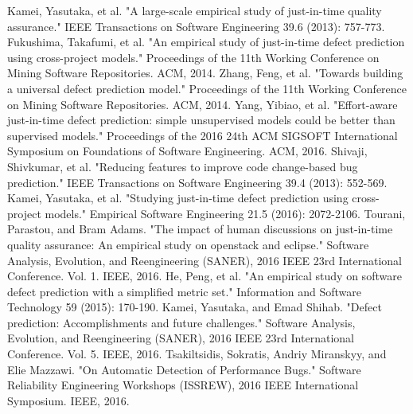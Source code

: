 \documentclass[10pt, conference, compsocconf]{IEEEtran}
\begin{document}
\begin{thebibliography}{1}
Kamei, Yasutaka, et al. "A large-scale empirical study of just-in-time quality assurance." IEEE Transactions on Software Engineering 39.6 (2013): 757-773.
Fukushima, Takafumi, et al. "An empirical study of just-in-time defect prediction using cross-project models." Proceedings of the 11th Working Conference on Mining Software Repositories. ACM, 2014.
Zhang, Feng, et al. "Towards building a universal defect prediction model." Proceedings of the 11th Working Conference on Mining Software Repositories. ACM, 2014.
Yang, Yibiao, et al. "Effort-aware just-in-time defect prediction: simple unsupervised models could be better than supervised models." Proceedings of the 2016 24th ACM SIGSOFT International Symposium on Foundations of Software Engineering. ACM, 2016.
Shivaji, Shivkumar, et al. "Reducing features to improve code change-based bug prediction." IEEE Transactions on Software Engineering 39.4 (2013): 552-569.
Kamei, Yasutaka, et al. "Studying just-in-time defect prediction using cross-project models." Empirical Software Engineering 21.5 (2016): 2072-2106.
Tourani, Parastou, and Bram Adams. "The impact of human discussions on just-in-time quality assurance: An empirical study on openstack and eclipse." Software Analysis, Evolution, and Reengineering (SANER), 2016 IEEE 23rd International Conference. Vol. 1. IEEE, 2016.
He, Peng, et al. "An empirical study on software defect prediction with a simplified metric set." Information and Software Technology 59 (2015): 170-190.
Kamei, Yasutaka, and Emad Shihab. "Defect prediction: Accomplishments and future challenges." Software Analysis, Evolution, and Reengineering (SANER), 2016 IEEE 23rd International Conference. Vol. 5. IEEE, 2016.
Tsakiltsidis, Sokratis, Andriy Miranskyy, and Elie Mazzawi. "On Automatic Detection of Performance Bugs." Software Reliability Engineering Workshops (ISSREW), 2016 IEEE International Symposium. IEEE, 2016.
\end{thebibliography}
\end{document}
